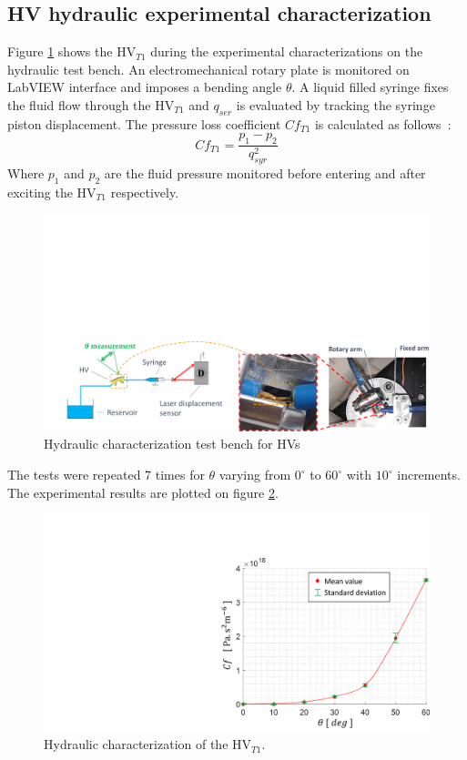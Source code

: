 \documentclass[3p,twocolumn,preprint]{elsarticle}
\begin{document}
	\subsection{HV hydraulic experimental characterization}	
	\label{subsec:HV hydraulic test bench presentation}
Figure \ref{fig:essais_hydraulique_VH} shows the HV$_{T1}$ during the experimental characterizations on the hydraulic test bench. An electromechanical rotary plate is monitored on LabVIEW interface and imposes a bending angle $\theta$. A liquid filled syringe fixes the fluid flow through the HV$_{T1}$ and $q_{ser}$ is evaluated by tracking the syringe piston displacement. The pressure loss coefficient $Cf_{T1}$ is calculated as \mbox{follows :}
\begin{equation}
	Cf_{T1} = \dfrac{p_1-p_2}{q_{syr}^2}
\end{equation}
Where $p_1$ and $p_2$ are the fluid pressure monitored before entering and after exciting the HV$_{T1}$ respectively.
\begin{figure}[!htb]
\begin{center}
	\captionsetup{justification=centering} 
	\includegraphics[trim={2cm 0cm 0cm 11cm},clip,width=.8\textwidth]{figures/essais_hydraulique_VH.pdf}
	\caption{Hydraulic characterization test bench for HVs}
	\label{fig:essais_hydraulique_VH}
\end{center}	
\end{figure}    
The tests were repeated 7 times for $\theta$ varying from $0^{\circ}$ to $60^{\circ}$ with $10^{\circ}$ increments. The experimental results are plotted on figure \ref{fig:resultats_essais_hydraulique_VH_D1mm}.
\begin{figure}[!htbp]
\centering
	\captionsetup{justification=centering}
	\includegraphics[trim={15.5cm 0cm 0cm 3.6cm},clip,width=0.7\linewidth]{figures/resultats_essais_hydraulique_VH_D1mm.pdf}
	\caption{Hydraulic characterization of the HV$_{T1}$.}
	\label{fig:resultats_essais_hydraulique_VH_D1mm}
\end{figure}
\end{document}
